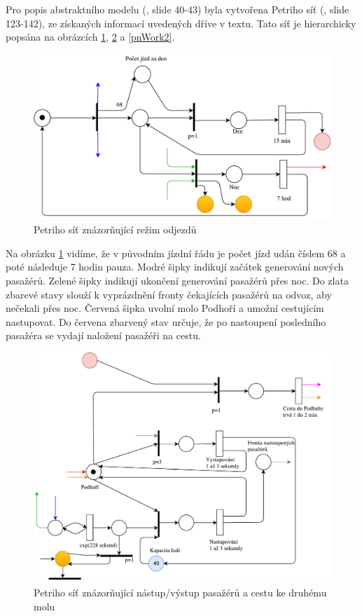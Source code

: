 \documentclass[11pt,a4paper]{article}
\begin{document}
  Pro popis abstraktního modelu (\cite{SLAJD}, slide 40-43) byla vytvořena Petriho síť (\cite{SLAJD}, slide 123-142),
  ze získaných informací uvedených dříve v textu. Tato síť je hierarchicky popsána na obrázcích \ref{pnTime}, \ref{pnWork} a \ref{pnWork2}.

	\begin{figure}[h]
		\centering
		\includegraphics[scale=0.7]{pn-daytime.pdf}
		\caption{Petriho síť znázorňující režim odjezdů}
		\label{pnTime}
	\end{figure}

	Na obrázku \ref{pnTime} vidíme, že v původním jízdní řádu je počet jízd udán číslem 68 a
	poté následuje 7 hodin pauza. Modré šipky indikují začátek generování nových pasažérů.
	Zelené šipky indikují ukončení generování pasažérů přes noc. Do zlata zbarevé stavy
	slouží k vyprázdnění fronty čekajících pasažérů na odvoz, aby nečekali přes noc.
	Červená šipka uvolní molo Podhoří a umožní cestujícím nastupovat. Do červena zbarvený
	stav určuje, že po nastoupení posledního pasažéra se vydají naložení pasažéři na cestu.

	\begin{figure}[h]
		\centering
		\includegraphics[scale=0.7]{pn-work.pdf}
		\caption{Petriho síť znázorňující nástup/výstup pasažérů a cestu ke druhému molu}
		\label{pnWork}
	\end{figure}
\end{document}
